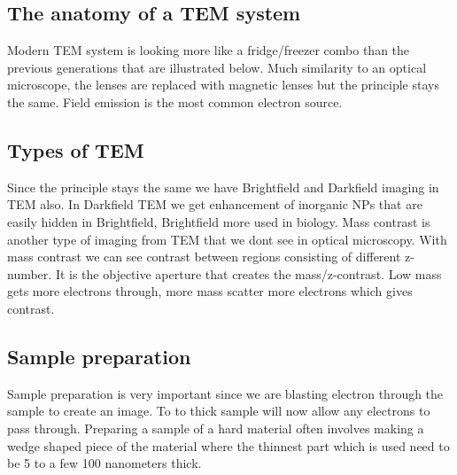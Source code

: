	\subsection*{The anatomy of a TEM system}
	Modern TEM system is looking more like a fridge/freezer combo than the previous generations that are illustrated below. Much similarity to an optical microscope, the lenses are replaced with magnetic lenses but the principle stays the same. Field emission is the most common electron source. 


	\subsection*{Types of TEM}
	Since the principle stays the same we have Brightfield and Darkfield imaging in TEM also. In Darkfield TEM we get enhancement of inorganic NPs that are easily hidden in Brightfield, Brightfield more used in biology. Mass contrast is another type of imaging from TEM that we dont see in optical microscopy. With mass contrast we can see contrast between regions consisting of different z-number. It is the objective aperture that creates the mass/z-contrast. Low mass gets more electrons through, more mass scatter more electrons which gives contrast. 

	\subsection*{Sample preparation}
	Sample preparation is very important since we are blasting electron through the sample to create an image. To to thick sample will now allow any electrons to pass through. Preparing a sample of a hard material often involves making a wedge shaped piece of the material where the thinnest part which is used need to be 5 to a few 100 nanometers thick.  
	  



	      

